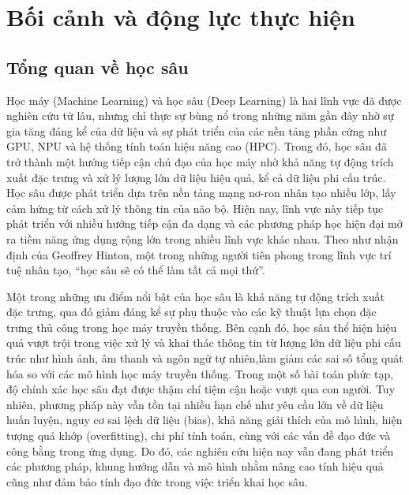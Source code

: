 \section{Bối cảnh và động lực thực hiện}
\subsection{Tổng quan về học sâu}
Học máy (Machine Learning) và học sâu (Deep Learning) là hai lĩnh vực đã được nghiên cứu từ lâu, nhưng chỉ thực sự bùng nổ trong những năm gần đây nhờ sự gia tăng đáng kể của dữ liệu và sự phát triển của các nền tảng phần cứng như GPU, NPU và hệ thống tính toán hiệu năng cao (HPC)\cite{ibm_2024_neural,26_sharifani_2023_machine}. Trong đó, học sâu đã trở thành một hướng tiếp cận chủ đạo của học máy nhờ khả năng tự động trích xuất đặc trưng và xử lý lượng lớn dữ liệu hiệu quả, kể cả dữ liệu phi cấu trúc. Học sâu được phát triển dựa trên nền tảng mạng nơ-ron nhân tạo nhiều lớp, lấy cảm hứng từ cách xử lý thông tin của não bộ. Hiện nay, lĩnh vực này tiếp tục phát triển với nhiều hướng tiếp cận đa dạng và các phương pháp học hiện đại mở ra tiềm năng ứng dụng rộng lớn trong nhiều lĩnh vực khác nhau\cite{28_khoei_2023_deep}. Theo như nhận định của Geoffrey Hinton, một trong những người tiên phong trong lĩnh vực trí tuệ nhân tạo, “học sâu sẽ có thể làm tất cả mọi thứ”\cite{hao_2020_ai}.

Một trong những ưu điểm nổi bật của học sâu là khả năng tự động trích xuất đặc trưng, qua đó giảm đáng kể sự phụ thuộc vào các kỹ thuật lựa chọn đặc trưng thủ công trong học máy truyền thống. Bên cạnh đó, học sâu thể hiện hiệu quả vượt trội trong việc xử lý và khai thác thông tin từ lượng lớn dữ liệu phi cấu trúc như hình ảnh, âm thanh và ngôn ngữ tự nhiên,làm giảm các sai số tổng quát hóa so với các mô hình học máy truyền thống\cite{14_10.1145/3776588}. Trong một số bài toán phức tạp, độ chính xác học sâu đạt được thậm chí tiệm cận hoặc vượt qua con người. Tuy nhiên, phương pháp này vẫn tồn tại nhiều hạn chế như yêu cầu lớn về dữ liệu huấn luyện, nguy cơ sai lệch dữ liệu (bias), khả năng giải thích của mô hình, hiện tượng quá khớp (overfitting), chi phí tính toán,\cite{27_alzubaidi_2021_review} cùng với các vấn đề đạo đức và công bằng trong ứng dụng\cite{28_khoei_2023_deep}. Do đó, các nghiên cứu hiện nay vẫn đang phát triển các phương pháp, khung hướng dẫn và mô hình nhằm nâng cao tính hiệu quả cũng như đảm bảo tính đạo đức trong việc triển khai học sâu. 

